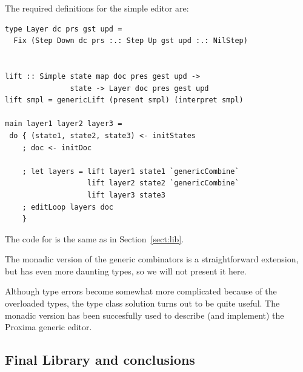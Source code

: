 \documentclass[preprint,natbib]{sigplanconf}
\begin{document}
The required definitions for the simple editor are:

\begin{small}
\begin{verbatim}
type Layer dc prs gst upd = 
  Fix (Step Down dc prs :.: Step Up gst upd :.: NilStep)

                
lift :: Simple state map doc pres gest upd ->
               state -> Layer doc pres gest upd
lift smpl = genericLift (present smpl) (interpret smpl)

main layer1 layer2 layer3 =
 do { (state1, state2, state3) <- initStates
    ; doc <- initDoc 

    ; let layers = lift layer1 state1 `genericCombine` 
                   lift layer2 state2 `genericCombine`
                   lift layer3 state3
    ; editLoop layers doc
    }
\end{verbatim}
\end{small}

The code for  is the same as in Section~\ref{sect:lib}.

The monadic version of the generic combinators is a straightforward extension, but has even more daunting types, so we will not present it here. 

Although type errors become somewhat more complicated because of the overloaded types, the type class solution turns out to be quite useful. The monadic version has been succesfully used to describe (and implement) the Proxima generic editor.


%																
\subsection{Final Library and conclusions} \label{sect:libAndConclusions}
\end{document}
